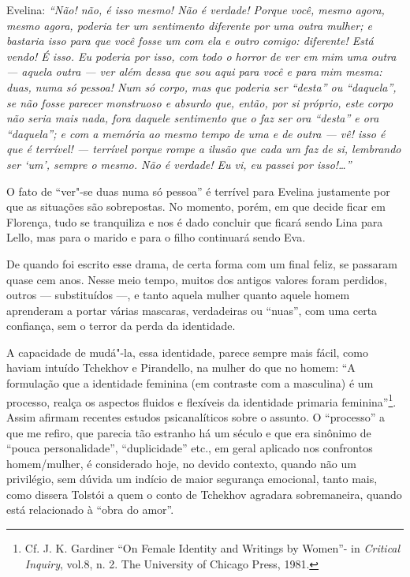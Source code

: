 Evelina: \emph{``Não! não, é isso mesmo! Não é verdade! Porque você, mesmo
agora, mesmo agora, poderia ter um sentimento diferente por uma outra
mulher; e bastaria isso para que você fosse um com ela e outro comigo:
diferente! Está vendo! É isso. Eu poderia por isso, com todo o horror de
ver em mim uma outra --- aquela outra --- ver além dessa que sou aqui para
você e para mim mesma: duas, numa só pessoa! Num só corpo, mas que
poderia ser ``desta'' ou ``daquela'', se não fosse parecer
monstruoso e absurdo que, então, por si próprio, este corpo não
seria mais nada, fora daquele sentimento que o faz ser ora ``desta'' e
ora ``daquela''; e com a memória ao mesmo tempo de uma e de outra --- vê!
isso é que é terrível! --- terrível porque rompe a ilusão que cada um faz
de si, lembrando ser `um', sempre o mesmo. Não é verdade! Eu vi, eu
passei por isso!\ldots{}''}

O fato de ``ver"-se duas numa só pessoa'' é terrível para Evelina
justamente por que as situações são sobrepostas. No momento, porém, em
que decide ficar em Florença, tudo se tranquiliza e nos é dado concluir
que ficará sendo Lina para Lello, mas para o marido e para o filho
continuará sendo Eva.

De quando foi escrito esse drama, de certa forma com um final feliz, se
passaram quase cem anos. Nesse meio tempo, muitos dos antigos valores
foram perdidos, outros --- substituídos ---, e tanto aquela mulher quanto
aquele homem aprenderam a portar várias mascaras, verdadeiras ou ``nuas'', com uma certa confiança, sem o terror da perda da identidade.

A capacidade de mudá"-la, essa identidade, parece sempre mais fácil, como
haviam intuído Tchekhov e Pirandello, na mulher do que no homem: ``A
formulação que a identidade feminina (em contraste com a masculina) é um
processo, realça os aspectos fluidos e flexíveis da identidade primaria
feminina''\footnote{Cf. J. K. Gardiner ``On Female Identity and Writings
  by Women''- in \emph{Critical Inquiry}, vol.8, n. 2. The University of
  Chicago Press, 1981.}. Assim afirmam recentes estudos psicanalíticos sobre o
assunto. O ``processo'' a que me refiro, que parecia tão estranho há um
século e que era sinônimo de ``pouca personalidade'', ``duplicidade''
etc., em geral aplicado nos confrontos homem/mulher, é considerado hoje,
no devido contexto, quando não um privilégio, sem dúvida um indício de maior segurança
emocional, tanto mais, como dissera Tolstói a quem o conto
de Tchekhov agradara sobremaneira, quando está relacionado à ``obra
do amor''.



